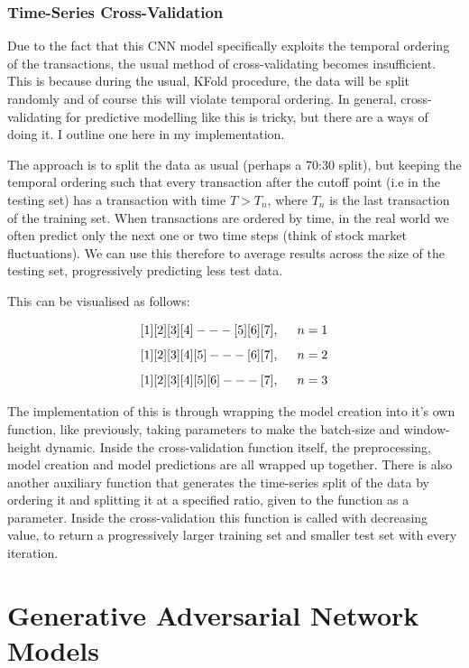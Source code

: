 \documentclass[12pt,a4paper,twoside]{report}
\begin{document}
\subsubsection{Time-Series Cross-Validation}

Due to the fact that this CNN model specifically exploits the temporal ordering of the transactions, the usual method of cross-validating becomes insufficient. This is because during the usual, KFold procedure, the data will be split randomly and of course this will violate temporal ordering. In general, cross-validating for predictive modelling like this is tricky, but there are a ways of doing it. I outline one here in my implementation. 

The approach is to split the data as usual (perhaps a 70:30 split), but keeping the temporal ordering such that every transaction after the cutoff point (i.e in the testing set) has a transaction with time $T > T_{n} $, where $T_{n}$ is the last transaction of the training set. When transactions are ordered by time, in the real world we often predict only the next one or two time steps (think of stock market fluctuations). We can use this therefore to average results across the size of the testing set, progressively predicting less test data. 

This can be visualised as follows:

$$ [1] [2] [3] [4]  --- [5] [6] [7] , \hspace{5mm}  n=1$$
$$ [1] [2] [3] [4] [5] --- [6] [7] ,\hspace{5mm}  n=2$$
$$ [1] [2] [3] [4] [5] [6] --- [7] ,\hspace{5mm}  n=3$$

The implementation of this is through wrapping the model creation into it's own function, like previously, taking parameters to make the batch-size and window-height dynamic. Inside the cross-validation function itself, the preprocessing, model creation and model predictions are all wrapped up together. There is also another auxiliary function that generates the time-series split of the data by ordering it and splitting it at a specified ratio, given to the function as a parameter. Inside the cross-validation this function is called with decreasing value, to return a progressively larger training set and smaller test set with every iteration. 

\section{Generative Adversarial Network Models}
\end{document}
